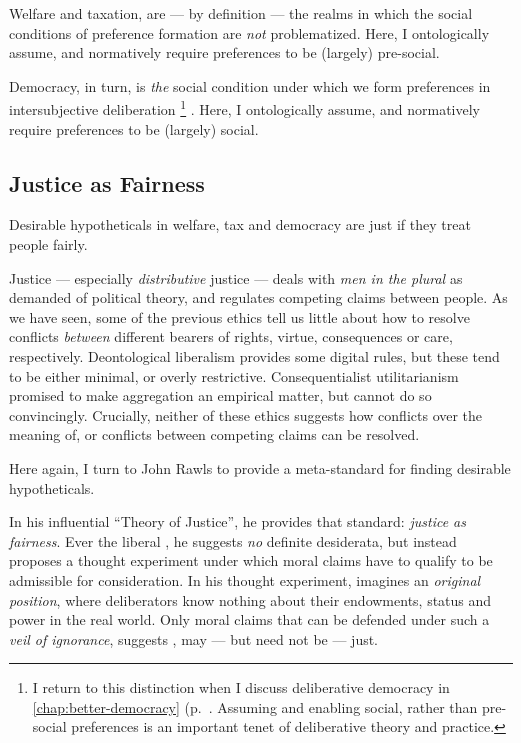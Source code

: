 \begin{enumerate}
		Welfare and taxation, are --- by definition --- the realms in which the social conditions of preference formation are \emph{not} problematized.
		Here, I ontologically assume, and normatively require preferences to be (largely) pre-social.
		
		Democracy, in turn, is \emph{the} social condition under which we form preferences in intersubjective deliberation
		\footnote{
			I return to this distinction when I discuss deliberative democracy in \autoref{chap:better-democracy} (p.~\pageref{chap:better-democracy}.
			Assuming and enabling social, rather than pre-social preferences is an important tenet of deliberative theory and practice. %
		}
		. 
		Here, I ontologically assume, and normatively require preferences to be (largely) social. 
\end{enumerate}

\subsection[Fair]{Justice as Fairness} \label{sec:fair}
Desirable hypotheticals in welfare, tax and democracy are just if they treat people fairly. 

Justice --- especially \emph{distributive} justice --- deals with \emph{men in the plural} as \citeauthor{Arendt1958} demanded of political theory, and regulates competing claims between people. 
As we have seen, some of the previous ethics tell us little about how to resolve conflicts \emph{between} different bearers of rights, virtue, consequences or care, respectively. 
Deontological liberalism provides some digital rules, but these tend to be either minimal, or overly restrictive.
Consequentialist utilitarianism promised to make aggregation an empirical matter, but cannot do so convincingly.
Crucially, neither of these ethics suggests how conflicts over the meaning of, or conflicts between competing claims can be resolved.

Here again, I turn to John Rawls \citeauthor{Rawls-1971-aa} to provide a meta-standard for finding desirable hypotheticals.
 
In his influential ``Theory of Justice'', he provides that standard: \emph{justice as fairness}. 
Ever the liberal \citep[and similar to above-mentioned][]{Cohen-1989-aa}, he suggests \emph{no} definite desiderata, but instead proposes a thought experiment under which moral claims have to qualify to be admissible for consideration. 
In his thought experiment, \citeauthor{Rawls-1971-aa} imagines an \emph{original position}, where deliberators know nothing about their endowments, status and power in the real world. 
Only moral claims that can be defended under such a \emph{veil of ignorance}, suggests \citeauthor{Rawls-1971-aa}, may --- but need not be --- just.

